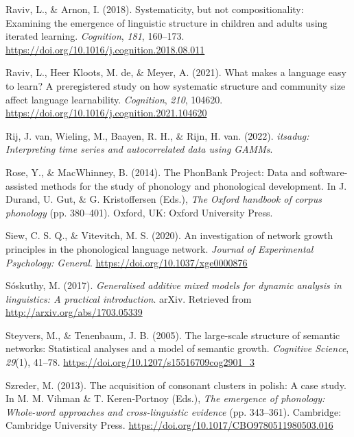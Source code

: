 \documentclass[
  man]{apa6}
\newlength{\cslhangindent}
\newenvironment{CSLReferences}[2] %
 {\begin{list}{}{%
  \setlength{\itemindent}{0pt}
  \setlength{\leftmargin}{0pt}
  \setlength{\parsep}{0pt}
  \ifodd #1
   \setlength{\leftmargin}{\cslhangindent}
   \setlength{\itemindent}{-1\cslhangindent}
  \fi
  \setlength{\itemsep}{#2\baselineskip}}}
 {\end{list}}
\begin{document}
\begin{CSLReferences}{1}{0}
Raviv, L., \& Arnon, I. (2018). Systematicity, but not compositionality: {Examining} the emergence of linguistic structure in children and adults using iterated learning. \emph{Cognition}, \emph{181}, 160--173. \url{https://doi.org/10.1016/j.cognition.2018.08.011}

Raviv, L., Heer Kloots, M. de, \& Meyer, A. (2021). What makes a language easy to learn? {A} preregistered study on how systematic structure and community size affect language learnability. \emph{Cognition}, \emph{210}, 104620. \url{https://doi.org/10.1016/j.cognition.2021.104620}

Rij, J. van, Wieling, M., Baayen, R. H., \& Rijn, H. van. (2022). \emph{{itsadug}: Interpreting time series and autocorrelated data using GAMMs}.

Rose, Y., \& MacWhinney, B. (2014). The {PhonBank} {Project}: {Data} and software-assisted methods for the study of phonology and phonological development. In J. Durand, U. Gut, \& G. Kristoffersen (Eds.), \emph{The {Oxford} handbook of corpus phonology} (pp. 380--401). Oxford, UK: Oxford University Press.

Siew, C. S. Q., \& Vitevitch, M. S. (2020). An investigation of network growth principles in the phonological language network. \emph{Journal of Experimental Psychology: General}. \url{https://doi.org/10.1037/xge0000876}

Sóskuthy, M. (2017). \emph{Generalised additive mixed models for dynamic analysis in linguistics: A practical introduction}. arXiv. Retrieved from \url{http://arxiv.org/abs/1703.05339}

Steyvers, M., \& Tenenbaum, J. B. (2005). The large-scale structure of semantic networks: Statistical analyses and a model of semantic growth. \emph{Cognitive Science}, \emph{29}(1), 41--78. \url{https://doi.org/10.1207/s15516709cog2901_3}

Szreder, M. (2013). The acquisition of consonant clusters in polish: A case study. In M. M. Vihman \& T. Keren-Portnoy (Eds.), \emph{The emergence of phonology: Whole-word approaches and cross-linguistic evidence} (pp. 343--361). Cambridge: Cambridge University Press. \url{https://doi.org/10.1017/CBO9780511980503.016}


\end{CSLReferences}
\end{document}
